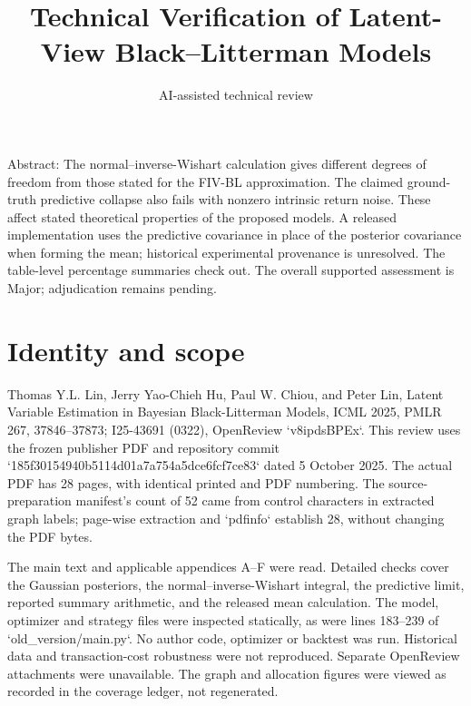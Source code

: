 \documentclass[10pt]{article}
\title{Technical Verification of Latent-View Black–Litterman Models}
\author{AI-assisted technical review}
\date{}
\begin{document}
\maketitle
Abstract: The normal–inverse-Wishart calculation gives different degrees of freedom from those stated for the FIV-BL approximation. The claimed ground-truth predictive collapse also fails with nonzero intrinsic return noise. These affect stated theoretical properties of the proposed models. A released implementation uses the predictive covariance in place of the posterior covariance when forming the mean; historical experimental provenance is unresolved. The table-level percentage summaries check out. The overall supported assessment is Major; adjudication remains pending.\par
\section*{Identity and scope}
Thomas Y.L. Lin, Jerry Yao-Chieh Hu, Paul W. Chiou, and Peter Lin, Latent Variable Estimation in Bayesian Black-Litterman Models, ICML 2025, PMLR 267, 37846–37873; I25-43691 (0322), OpenReview `v8ipdsBPEx`. This review uses the frozen publisher PDF and repository commit `185f30154940b5114d01a7a754a5dce6fcf7ce83` dated 5 October 2025. The actual PDF has 28 pages, with identical printed and PDF numbering. The source-preparation manifest’s count of 52 came from control characters in extracted graph labels; page-wise extraction and `pdfinfo` establish 28, without changing the PDF bytes.\par
The main text and applicable appendices A–F were read. Detailed checks cover the Gaussian posteriors, the normal–inverse-Wishart integral, the predictive limit, reported summary arithmetic, and the released mean calculation. The model, optimizer and strategy files were inspected statically, as were lines 183–239 of `old\_version/main.py`. No author code, optimizer or backtest was run. Historical data and transaction-cost robustness were not reproduced. Separate OpenReview attachments were unavailable. The graph and allocation figures were viewed as recorded in the coverage ledger, not regenerated.\par
\end{document}
